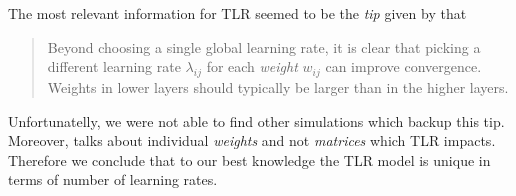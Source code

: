 The most relevant information for TLR seemed to be the \emph{tip} given by \citet{lecun2012efficient} that \blockquote{Beyond choosing a single global learning rate, it is clear that picking a different learning rate $\lambda_{ij}$ for each \emph{weight} $w_{ij}$ can improve convergence. Weights in lower layers should typically be larger than in the higher layers.} Unfortunatelly, we were not able to find other simulations which backup this tip. Moreover, \citet{lecun2012efficient} talks about individual \emph{weights} and not \emph{matrices} which TLR impacts. Therefore we conclude that to our best knowledge the TLR model is unique in terms of number of learning rates. 

